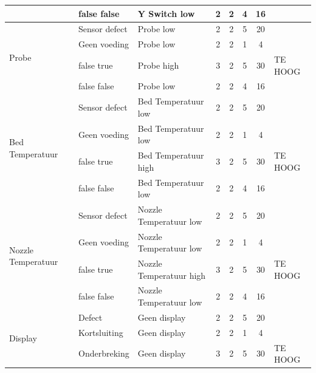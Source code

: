 \documentclass{article}
\begin{document}
\begin{landscape}
\begin{longtable}{|l|l|l|c|c|c|c|l|}
                                            & false false       & Y Switch low  & 2 & 2 & 4 & 16 & \\ 
                                            \hline
        \multirow{4}{*}{Probe}              & Sensor defect     & Probe low  & 2 & 2 & 5 & 20 & \\
                                            & Geen voeding      & Probe low  & 2 & 2 & 1 &  4 & \\
                                            & false true        & Probe high & 3 & 2 & 5 & 30 & TE HOOG \\
                                            & false false       & Probe low  & 2 & 2 & 4 & 16 & \\ 
                                            \hline
        \multirow{4}{*}{Bed Temperatuur}    & Sensor defect     & Bed Temperatuur low  & 2 & 2 & 5 & 20 & \\
                                            & Geen voeding      & Bed Temperatuur low  & 2 & 2 & 1 &  4 & \\
                                            & false true        & Bed Temperatuur high & 3 & 2 & 5 & 30 & TE HOOG \\
                                            & false false       & Bed Temperatuur low  & 2 & 2 & 4 & 16 & \\ 
                                            \hline
        \multirow{4}{*}{Nozzle Temperatuur} & Sensor defect     & Nozzle Temperatuur low  & 2 & 2 & 5 & 20 & \\
                                            & Geen voeding      & Nozzle Temperatuur low  & 2 & 2 & 1 &  4 & \\
                                            & false true        & Nozzle Temperatuur high & 3 & 2 & 5 & 30 & TE HOOG \\
                                            & false false       & Nozzle Temperatuur low  & 2 & 2 & 4 & 16 & \\ 
                                            \hline          
        \multirow{3}{*}{Display}            & Defect            & Geen display  & 2 & 2 & 5 & 20 & \\ 
                                            & Kortsluiting      & Geen display  & 2 & 2 & 1 &  4 & \\
                                            & Onderbreking      & Geen display  & 3 & 2 & 5 & 30 & TE HOOG \\
                                            \hline 

\end{longtable}
\end{landscape}
\end{document}
